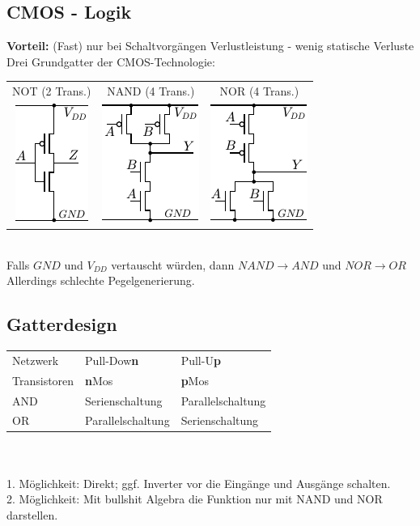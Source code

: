 \documentclass[6pt,a4paper]{scrartcl}
\renewcommand{\emph}[1]{\textsf{\textbf{#1}}}
\newcommand{\ra}[0]{\ensuremath{\rightarrow}} 									%
\begin{document}
\begin{multicols*}{3}
\section{CMOS - Logik}
	\emph{Vorteil:}	 (Fast) nur bei Schaltvorgängen Verlustleistung - wenig statische Verluste \\
Drei Grundgatter der CMOS-Technologie:\\
	\begin{tabular}{ccc}
		NOT (2 Trans.) & NAND (4 Trans.) & NOR (4 Trans.)\\
		\includegraphics{./img/ds/mosfet_not.pdf} \qquad & \includegraphics{./img/ds/mosfet_nand.pdf} \qquad & \includegraphics{./img/ds/mosfet_nor.pdf} \\
	\end{tabular}\\
	Falls $GND$ und $V_{DD}$ vertauscht würden, dann $NAND \ra AND$ und $NOR \ra OR$\\
	Allerdings schlechte Pegelgenerierung.

	\subsection{Gatterdesign}
	\begin{tabular}{l|l|l}
		Netzwerk & Pull-Dow\bf{n} & Pull-U\bf{p} \\
		Transistoren & \textbf{n}Mos & \textbf{p}Mos \\ \hline
		AND & Serienschaltung	 & Parallelschaltung \\
		OR & Parallelschaltung & Serienschaltung \\
	\end{tabular}\\ \\
	1. Möglichkeit: Direkt; ggf. Inverter vor die Eingänge und Ausgänge schalten.\\
	2. Möglichkeit: Mit bullshit Algebra die Funktion nur mit NAND und NOR darstellen.


\end{multicols*}
\end{document}
